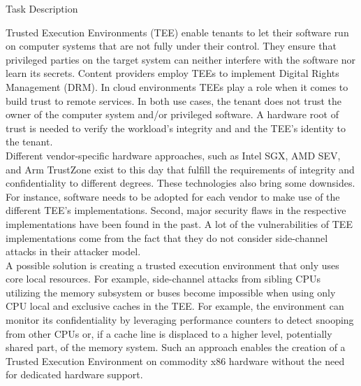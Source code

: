 \begin{center}
  \Large
  Task Description
\end{center}

Trusted Execution Environments (TEE) enable tenants to let their software run on
computer systems that are not fully under their control. They ensure that
privileged parties on the target system can neither interfere with the software
nor learn its secrets. Content providers employ TEEs to implement Digital Rights
Management (DRM). In cloud environments TEEs play a role when it comes to build
trust to remote services. In both use cases, the tenant does not trust the owner
of the computer system and/or privileged software. A hardware root of trust is
needed to verify the workload's integrity and and the TEE's identity to the
tenant.\\

Different vendor-specific hardware approaches, such as Intel SGX, AMD SEV, and
Arm TrustZone exist to this day that fulfill the requirements of integrity and
confidentiality to different degrees. These technologies also bring some
downsides. For instance, software needs to be adopted for each vendor to make
use of the different TEE's implementations. Second, major security flaws in the
respective implementations have been found in the past. A lot of the
vulnerabilities of TEE implementations come from the fact that they do not
consider side-channel attacks in their attacker model.\\

A possible solution is creating a trusted execution environment that only uses
core local resources. For example, side-channel attacks from sibling CPUs
utilizing the memory subsystem or buses become impossible when using only CPU
local and exclusive caches in the TEE. For example, the environment can monitor
its confidentiality by leveraging performance counters to detect snooping from
other CPUs or, if a cache line is displaced to a higher level, potentially
shared part, of the memory system. Such an approach enables the creation of a
Trusted Execution Environment on commodity x86 hardware without the need for
dedicated hardware support.\\

